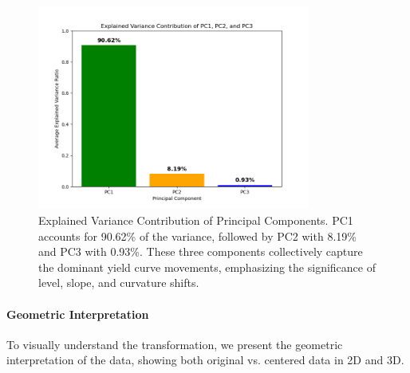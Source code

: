 \documentclass[12pt]{article}
\begin{document}
\begin{figure}[H]
    \centering
    \includegraphics[width=0.8\textwidth]{visuals/pca_explained_variance.png}
    \caption{Explained Variance Contribution of Principal Components. PC1 accounts for 90.62\% of the variance, followed by PC2 with 8.19\% and PC3 with 0.93\%. These three components collectively capture the dominant yield curve movements, emphasizing the significance of level, slope, and curvature shifts.}
    \label{fig:pca_explained_variance}
\end{figure}


\paragraph{Geometric Interpretation}

To visually understand the transformation, we present the geometric interpretation of the data, showing both original vs. centered data in 2D and 3D.
\end{document}

